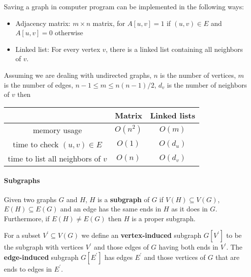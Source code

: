                Saving a graph in computer program can be implemented in the following ways:
                \begin{itemize}
                    \item Adjacency matrix: $m \times n$ matrix, for $A[u, v] = 1$ if $(u, v) \in E$ and $A[u, v] = 0$ otherwise
                    \item Linked list: For every vertex $v$, there is a linked list containing all neighbors of $v$.
                \end{itemize}
                Assuming we are dealing with undirected graphs, $n$ is the number of vertices, $m$ is the number of edges, $n - 1 \le m \le n(n-1)/2$, $d_v$ is the number of neighbors of $v$ then
                \begin{table}[H]
                    \centering
                    \begin{tabular}{|c|c|c|}
                        \hline
                         & Matrix & Linked lists\\
                        \hline
                        memory usage & $O(n^2)$ & $O(m)$\\
                        \hline
                        time to check $(u, v) \in E$ & $O(1)$ & $O(d_u)$\\
                        \hline
                        time to list all neighbors of $v$ & $O(n)$ & $O(d_v)$\\
                        \hline
                    \end{tabular}
                \end{table}

            \paragraph{Subgraphs}
                \begin{definition}[Subgraph]
                    Given two graphs $G$ and $H$, $H$ is a \textbf{subgraph} of $G$ if $V(H)\subseteq V(G)$, $E(H)\subseteq E(G)$ and an edge has the same ends in $H$ as it does in $G$. Furthermore, if $E(H)\neq E(G)$ then $H$ is a proper subgraph.
                \end{definition}

                \begin{definition}
                    For a subset $V^\prime \subseteq V(G)$ we define an \textbf{vertex-induced} subgraph $G[V^\prime ]$ to be the subgraph with vertices $V^\prime$ and those edges of $G$ having both ends in $V^\prime$. The \textbf{edge-induced} subgraph $G[E^\prime ]$ has edges $E^\prime$ and those vertices of $G$ that are ends to edges in $E^\prime$.
                \end{definition}

